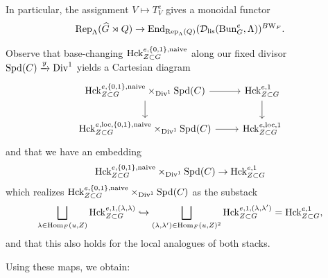 In particular, the assignment $V \mapsto T^{e}_{V}$ gives a monoidal functor 
\begin{equation*}
    \textnormal{Rep}_{\Lambda}(\widehat{G} \rtimes Q) \to \textnormal{End}_{\textnormal{Rep}_{\Lambda}(Q)}(\mathcal{D}_{\textnormal{lis}}(\mathrm{Bun}_{G}^{e},\Lambda))^{B\mathrm{W}_{F}}.
\end{equation*}

Observe that base-changing $\mathrm{Hck}_{Z \subset G}^{e,\{0,1\},\textnormal{naive}}$ along our fixed divisor $\mathrm{Spd}(C) \xrightarrow{y} \mathrm{Div}^{1}$ yields a Cartesian diagram
\[
\begin{tikzcd}
\Hck_{Z \subset G}^{e,\{0,1\},\tn{naive}} \times_{\Div^{1}}  \Spd(C) \arrow{r} \arrow{d} & \Hck_{Z \subset G}^{e,1} \arrow{d} \\
\Hck_{Z \subset G}^{e,\loc,\{0,1\},\tn{naive}} \times_{\Div^{1}} \Spd(C) \arrow{r}  & \Hck_{Z \subset G}^{e,\loc,1}
\end{tikzcd}
\]
and that we have an embedding
\begin{equation*}
    \mathrm{Hck}_{Z \subset G}^{e,\{0,1\},\textnormal{naive}} \times_{\mathrm{Div}^{1}}  \mathrm{Spd}(C) \to \mathrm{Hck}_{Z \subset G}^{e,1}
\end{equation*}
which realizes $\mathrm{Hck}_{Z \subset G}^{e,\{0,1\},\textnormal{naive}} \times_{\mathrm{Div}^{1}} \mathrm{Spd}(C)$ as the substack
\begin{equation}\label{eq:naiveincl}
     \bigsqcup_{\lambda \in \mathrm{Hom}_{F}(u,Z)} \mathrm{Hck}_{Z \subset G}^{e,1,(\lambda,\lambda)} \hookrightarrow \bigsqcup_{(\lambda,\lambda') \in \mathrm{Hom}_{F}(u,Z)^{2}} \mathrm{Hck}_{Z \subset G}^{e,1,(\lambda,\lambda')} = \mathrm{Hck}_{Z \subset G}^{e,1},
\end{equation}
and that this also holds for the local analogues of both stacks.

Using these maps, we obtain:

